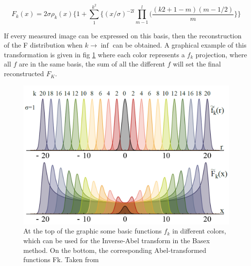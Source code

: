 \begin{equation}
F_{k}(x) = 2\sigma \rho_{k}(x)\lbrace 1 + \sum^{k^{2}}_{1}\lbrace (x/\sigma)^{-2l} \prod^{l}_{m-1}(\dfrac{(k2+ 1-m)(m-1/2)}{m}\rbrace \rbrace
\end{equation}

If every measured image can be expressed on this basis, then the reconstruction of the F distribution when $k\rightarrow \inf$ can be obtained. A graphical example of this transformation is given in fig \ref{img:Abel} where each color represents a $f_{k}$ projection, where all $f$ are in the same basis, the sum of all the different $f$ will set the final reconstructed $F_{K}$.

\begin{figure}[h!]
\label{img:Abel}
 \caption{At the top of the graphic some basic functions $f_{k}$ in different colors, which can be used for the Inverse-Abel transform in the Basex method. On the bottom, the corresponding Abel-transformed functions Fk. Taken from \cite{fechner_lutz_aufbau_2011}}
 \centering
 \includegraphics[width=10 cm]{../Images/abel transform pbasex function.png}
 \end{figure}

